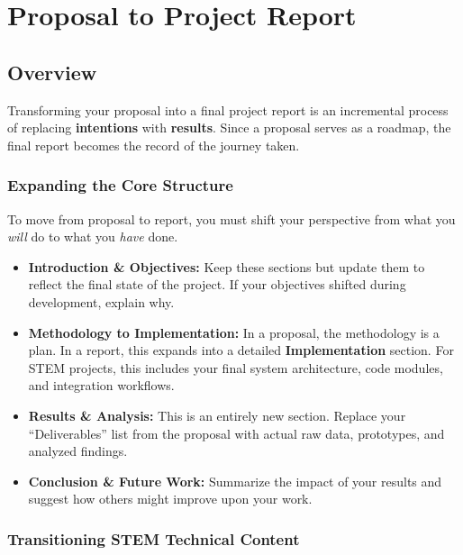 \documentclass{tietreport}
\author{%
  \texttt{102XXXXXXX} {Name Title} \\
  \texttt{102XXXXXXX} {Name Title} \\
  \texttt{102XXXXXXX} {Name Title} \\
  \texttt{102XXXXXXX} {Name Title}
}
\begin{document}
\maketitle
\tableofcontents

\chapter{Proposal to Project Report}

\section{Overview}

Transforming your proposal into a final project report
is an incremental process of replacing
\textbf{intentions} with \textbf{results}. Since a
proposal serves as a roadmap, the final report becomes
the record of the journey taken.

\subsection{Expanding the Core Structure}

To move from proposal to report, you must shift your
perspective from what you \textit{will} do to what you
\textit{have} done.

\begin{itemize}
\item \textbf{Introduction \& Objectives:} Keep these
  sections but update them to reflect the final state
  of the project. If your objectives shifted during
  development, explain why.
\item \textbf{Methodology to Implementation:} In a
  proposal, the methodology is a plan. In a report,
  this expands into a detailed \textbf{Implementation}
  section. For STEM projects, this includes your final
  system architecture, code modules, and integration
  workflows.
\item \textbf{Results \& Analysis:} This is an entirely
  new section. Replace your ``Deliverables'' list from
  the proposal with actual raw data, prototypes, and
  analyzed findings.
\item \textbf{Conclusion \& Future Work:} Summarize the
  impact of your results and suggest how others might
  improve upon your work.
\end{itemize}

\subsection{Transitioning STEM Technical Content}
\end{document}

